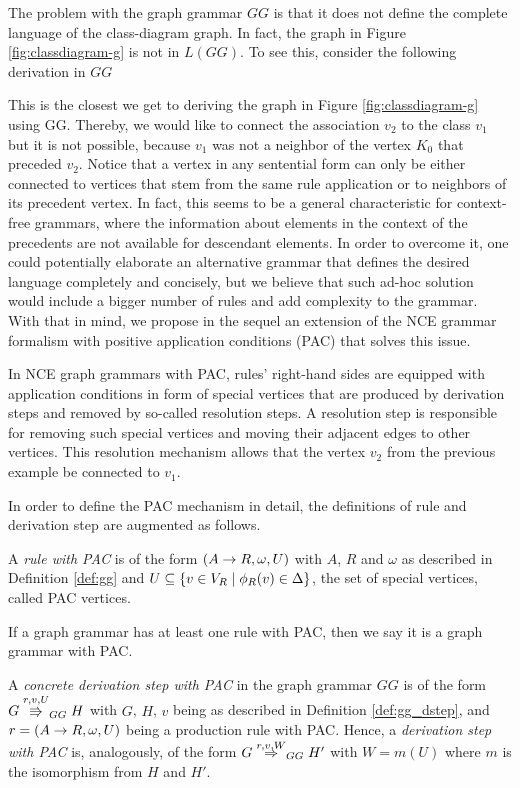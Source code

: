 The problem with the graph grammar $GG$ is that it does not define the complete language of the class-diagram graph. In fact, the graph in Figure \ref{fig:classdiagram-g} is not in $L(GG)$. To see this, consider the following derivation in $GG$



This is the closest we get to deriving the graph in Figure \ref{fig:classdiagram-g} using GG. Thereby, we would like to connect the association $v_2$ to the class $v_1$ but it is not possible, because $v_1$ was not a neighbor of the vertex $K_0$ that preceded $v_2$. Notice that a vertex in any sentential form can only be either connected to vertices that stem from the same rule application or to neighbors of its precedent vertex. In fact, this seems to be a general characteristic for context-free grammars, where the information about elements in the context of the precedents are not available for descendant elements. In order to overcome it, one could potentially elaborate an alternative grammar that defines the desired language completely and concisely, but we believe that such ad-hoc solution would include a bigger number of rules and add complexity to the grammar. With that in mind, we propose in the sequel an extension of the NCE grammar formalism with positive application conditions (PAC) that solves this issue. 

In NCE graph grammars with PAC, rules' right-hand sides are equipped with application conditions in form of special vertices that are produced by derivation steps and removed by so-called resolution steps. A resolution step is responsible for removing such special vertices and moving their adjacent edges to other vertices. This resolution mechanism allows that the vertex $v_2$ from the previous example be connected to $v_1$. 

In order to define the PAC mechanism in detail, the definitions of rule and derivation step are augmented as follows.

\begin{definition}
	A \emph{rule with PAC} is of the form $(A \to R, \omega, U)$ with $A$, $R$ and $\omega$ as described in Definition \ref{def:gg} and $U \subseteq \{v \in V_R \; | \; \phi_R(v) \in \Delta\}$, the set of special vertices, called PAC vertices.
\end{definition}

If a graph grammar has at least one rule with PAC, then we say it is a graph grammar with PAC.

\begin{definition}
	A \textit{concrete derivation step with PAC} in the graph grammar $GG$ is of the form $G \overset{r,v,U}{\Rrightarrow}_{GG} H$ with $G$, $H$, $v$ being as described in Definition \ref{def:gg_dstep}, and $r = (A \to R, \omega, U)$ being a production rule with PAC. Hence, a \textit{derivation step with PAC} is, analogously, of the form $G \derivpac{r}{v}{W}{GG} H'$ with $W = m(U)$ where $m$ is the isomorphism from $H$ and $H'$.
\end{definition}

